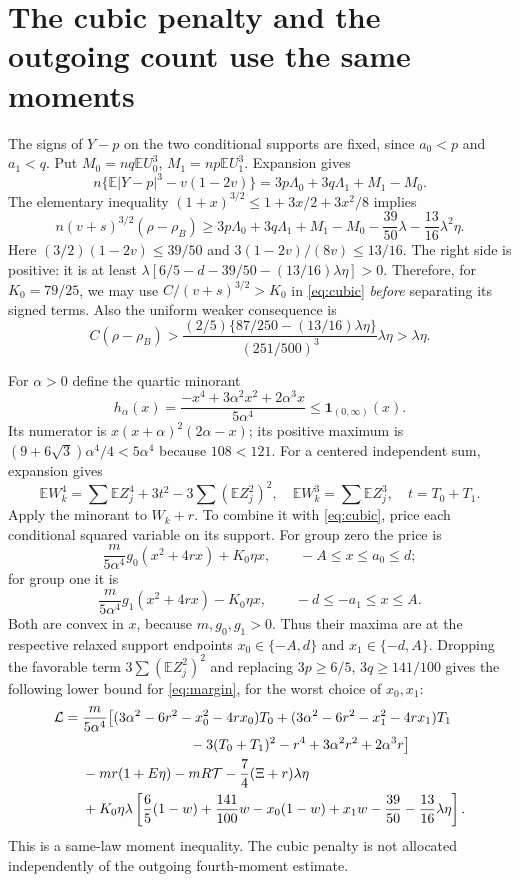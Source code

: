 \documentclass[11pt,a4paper]{article}
\newcommand{\E}{\mathbb E}\newcommand{\Pp}{\mathbb P}
\begin{document}
\section{The cubic penalty and the outgoing count use the same moments}
The signs of $Y-p$ on the two conditional supports are fixed, since
$a_0<p$ and $a_1<q$. Put $M_0=nq\E U_0^3$, $M_1=np\E U_1^3$.
Expansion gives
\[
 n\{\E|Y-p|^3-v(1-2v)\}
       =3p\Lambda_0+3q\Lambda_1+M_1-M_0.
\]
The elementary inequality $(1+x)^{3/2}\le1+3x/2+3x^2/8$ implies
\begin{equation}\label{eq:cubic}
 n(v+s)^{3/2}(\rho-\rho_B)
 \ge3p\Lambda_0+3q\Lambda_1+M_1-M_0
               -\frac{39}{50}\lambda-\frac{13}{16}\lambda^2\eta.
\end{equation}
Here $(3/2)(1-2v)\le39/50$ and $3(1-2v)/(8v)\le13/16$.
The right side is positive: it is at least
$\lambda[6/5-d-39/50-(13/16)\lambda\eta]>0$.
Therefore, for $K_0=79/25$, we may use
$C/(v+s)^{3/2}>K_0$ in \eqref{eq:cubic} \emph{before} separating its
signed terms. Also the uniform weaker consequence is
\begin{equation}\label{eq:unitgain}
 C(\rho-\rho_B)>
 \frac{(2/5)\{87/250-(13/16)\lambda\eta\}}{(251/500)^3}
                  \lambda\eta>\lambda\eta.
\end{equation}

For $\alpha>0$ define the quartic minorant
\[
 h_\alpha(x)=\frac{-x^4+3\alpha^2x^2+2\alpha^3x}{5\alpha^4}
                         \le\mathbf1_{(0,\infty)}(x).
\]
Its numerator is $x(x+\alpha)^2(2\alpha-x)$; its positive maximum is
$(9+6\sqrt3)\alpha^4/4<5\alpha^4$ because $108<121$.
For a centered independent sum, expansion gives
\[
 \E W_k^4=\sum\E Z_j^4+3t^2-3\sum(\E Z_j^2)^2,
 \quad\E W_k^3=\sum\E Z_j^3,\quad t=T_0+T_1.
\]
Apply the minorant to $W_k+r$. To combine it with \eqref{eq:cubic},
price each conditional squared variable on its support. For group zero
the price is
\[
 \frac m{5\alpha^4}g_0(x^2+4rx)+K_0\eta x,
 \qquad -A\le x\le a_0\le d;
\]
for group one it is
\[
 \frac m{5\alpha^4}g_1(x^2+4rx)-K_0\eta x,
 \qquad -d\le-a_1\le x\le A.
\]
Both are convex in $x$, because $m,g_0,g_1>0$. Thus their maxima are at
the respective relaxed support endpoints $x_0\in\{-A,d\}$ and
$x_1\in\{-d,A\}$. Dropping the favorable term
$3\sum(\E Z_j^2)^2$ and replacing $3p\ge6/5$, $3q\ge141/100$
gives the following lower bound for \eqref{eq:margin}, for the worst choice
of $x_0,x_1$:
\begin{align}\label{eq:polynomial}
\mathcal L={}&\frac m{5\alpha^4}\big[
 (3\alpha^2-6r^2-x_0^2-4rx_0)T_0
 +(3\alpha^2-6r^2-x_1^2-4rx_1)T_1\notag\\
 &\hspace{27mm}-3(T_0+T_1)^2-r^4+3\alpha^2r^2+2\alpha^3r\big]\notag\\
 &-mr(1+E\eta)-mR\mathcal T-\frac74(\Xi+r)\lambda\eta\\
 &+K_0\eta\lambda\left[
 \frac65(1-w)+\frac{141}{100}w-x_0(1-w)+x_1w
          -\frac{39}{50}-\frac{13}{16}\lambda\eta\right].\notag
\end{align}
This is a same-law moment inequality. The cubic penalty is not allocated
independently of the outgoing fourth-moment estimate.
\end{document}
